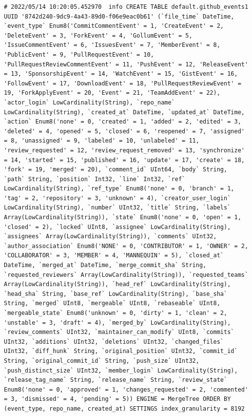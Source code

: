 \begin{verbatim}
# 2022/05/14 10:20:05.452970  info CREATE TABLE default.github_events1 UUID '8742d240-9dc9-4a43-89d0-f06e9eac0b61' (`file_time` DateTime, `event_type` Enum8('CommitCommentEvent' = 1, 'CreateEvent' = 2, 'DeleteEvent' = 3, 'ForkEvent' = 4, 'GollumEvent' = 5, 'IssueCommentEvent' = 6, 'IssuesEvent' = 7, 'MemberEvent' = 8, 'PublicEvent' = 9, 'PullRequestEvent' = 10, 'PullRequestReviewCommentEvent' = 11, 'PushEvent' = 12, 'ReleaseEvent' = 13, 'SponsorshipEvent' = 14, 'WatchEvent' = 15, 'GistEvent' = 16, 'FollowEvent' = 17, 'DownloadEvent' = 18, 'PullRequestReviewEvent' = 19, 'ForkApplyEvent' = 20, 'Event' = 21, 'TeamAddEvent' = 22), `actor_login` LowCardinality(String), `repo_name` LowCardinality(String), `created_at` DateTime, `updated_at` DateTime, `action` Enum8('none' = 0, 'created' = 1, 'added' = 2, 'edited' = 3, 'deleted' = 4, 'opened' = 5, 'closed' = 6, 'reopened' = 7, 'assigned' = 8, 'unassigned' = 9, 'labeled' = 10, 'unlabeled' = 11, 'review_requested' = 12, 'review_request_removed' = 13, 'synchronize' = 14, 'started' = 15, 'published' = 16, 'update' = 17, 'create' = 18, 'fork' = 19, 'merged' = 20), `comment_id` UInt64, `body` String, `path` String, `position` Int32, `line` Int32, `ref` LowCardinality(String), `ref_type` Enum8('none' = 0, 'branch' = 1, 'tag' = 2, 'repository' = 3, 'unknown' = 4), `creator_user_login` LowCardinality(String), `number` UInt32, `title` String, `labels` Array(LowCardinality(String)), `state` Enum8('none' = 0, 'open' = 1, 'closed' = 2), `locked` UInt8, `assignee` LowCardinality(String), `assignees` Array(LowCardinality(String)), `comments` UInt32, `author_association` Enum8('NONE' = 0, 'CONTRIBUTOR' = 1, 'OWNER' = 2, 'COLLABORATOR' = 3, 'MEMBER' = 4, 'MANNEQUIN' = 5), `closed_at` DateTime, `merged_at` DateTime, `merge_commit_sha` String, `requested_reviewers` Array(LowCardinality(String)), `requested_teams` Array(LowCardinality(String)), `head_ref` LowCardinality(String), `head_sha` String, `base_ref` LowCardinality(String), `base_sha` String, `merged` UInt8, `mergeable` UInt8, `rebaseable` UInt8, `mergeable_state` Enum8('unknown' = 0, 'dirty' = 1, 'clean' = 2, 'unstable' = 3, 'draft' = 4), `merged_by` LowCardinality(String), `review_comments` UInt32, `maintainer_can_modify` UInt8, `commits` UInt32, `additions` UInt32, `deletions` UInt32, `changed_files` UInt32, `diff_hunk` String, `original_position` UInt32, `commit_id` String, `original_commit_id` String, `push_size` UInt32, `push_distinct_size` UInt32, `member_login` LowCardinality(String), `release_tag_name` String, `release_name` String, `review_state` Enum8('none' = 0, 'approved' = 1, 'changes_requested' = 2, 'commented' = 3, 'dismissed' = 4, 'pending' = 5)) ENGINE = MergeTree ORDER BY (event_type, repo_name, created_at) SETTINGS index_granularity = 8192

\end{verbatim}
